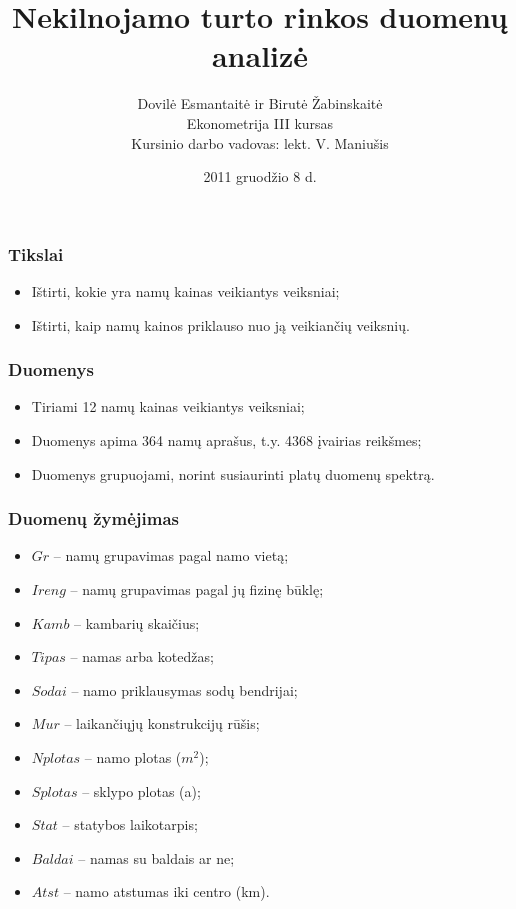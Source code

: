 \documentclass[utf8,hyperref={unicode}]{beamer}
\title{Nekilnojamo turto rinkos duomenų analizė}
\author[Dovilė Esmantaitė ir Birutė Žabinskaitė]{Dovilė Esmantaitė ir Birutė Žabinskaitė\\ Ekonometrija III kursas\\ Kursinio darbo vadovas: lekt. V. Maniušis}
\institute[Vilnius University] {
    
    Vilniaus Universitetas
    \and
    
    Matematikos ir informatikos fakultetas
 }
\date{2011 gruodžio 8 d.}
\theoremstyle{change}\newtheorem{teorema}{Teiginys}
\theoremstyle{change}\newtheorem{salyga}{}
\begin{document}
\begin{frame}
    \titlepage
\end{frame}

\begin{frame}
    \frametitle{Tikslai} 
    \begin{itemize} \Large
	\item{ Ištirti, kokie yra namų kainas veikiantys veiksniai;}
            \vskip 20pt
            \item Ištirti, kaip namų kainos priklauso nuo ją veikiančių veiksnių.
    \end{itemize}
\end{frame}

\begin{frame}
    \frametitle{Duomenys} 
    \begin{itemize} \Large
	\item  Tiriami 12 namų kainas veikiantys veiksniai;
	\item Duomenys apima 364 namų aprašus, t.y. 4368 įvairias reikšmes;
	 \item Duomenys grupuojami, norint susiaurinti platų duomenų spektrą.
    \end{itemize}
\end{frame}

\begin{frame}
\frametitle{Duomenų žymėjimas}
\begin{itemize}
\item $Gr$ -- namų grupavimas pagal namo vietą;
\item$Ireng$ -- namų grupavimas pagal jų fizinę būklę;
\item$Kamb$ -- kambarių skaičius; 
\item $Tipas$ -- namas arba kotedžas;
\item$Sodai$ -- namo priklausymas sodų bendrijai; 
\item$Mur$ -- laikančiųjų konstrukcijų rūšis;
\item$Nplotas$ -- namo plotas ($m^2$); 
\item$Splotas$ -- sklypo plotas (a); 
\item$Stat$ -- statybos laikotarpis; 
\item$Baldai$ -- namas su baldais ar ne; 
\item$Atst$ -- namo atstumas iki centro (km).
\end{itemize}
\end{frame}
\end{document}
